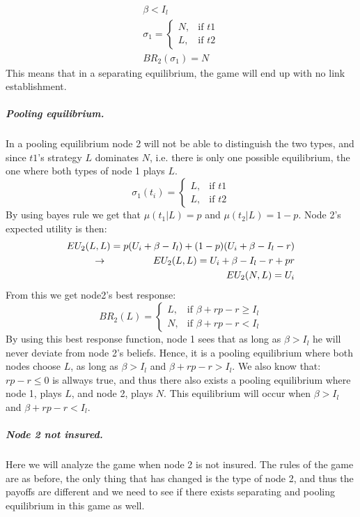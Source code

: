 \begin{eqnarray}
\beta<I_{l}\\
 \sigma_{1}= 
\begin{cases}
   N,& \text{if } t1\\
   L,& \text{if } t2  
\end{cases}\\
BR_{2}(\sigma_{1})=N
\end{eqnarray} 
This means that in a separating equilibrium, the game will end up with no link establishment.
\subparagraph{Pooling equilibrium.}
In a pooling equilibrium node 2 will not be able to distinguish the two types, and since $t1$'s strategy $L$ dominates $N$, i.e. there is only one possible equilibrium, the one where both types of node 1 plays $L$.
\begin{equation}
    \sigma_{1}(t_{i})= 
\begin{cases}
   L,& \text{if } t1\\
   L,& \text{if } t2  
\end{cases}
\label{eq:node2beliefpooling}
\end{equation}
By using bayes rule we get that $\mu(t_{1}|L)=p$ and $\mu(t_{2}|L)=1-p$.
Node 2's expected utility is then:
\begin{eqnarray}
EU_{2}(L,L)=p(U_{i}+\beta-I_{l})+(1-p)(U_{i}+\beta-I_{l}-r)\nonumber\\
\llap{$\rightarrow$\hspace{50pt}}EU_{2}(L,L)=U_{i}+\beta-I_{l}-r+pr\\
EU_{2}(N,L)=U_{i}
\end{eqnarray}
From this we get node2's best response:
\begin{equation}
BR_{2}(L)=
\begin{cases}
L ,& \text{if } \beta + rp-r\geq I_{l} \\
N ,& \text{if } \beta +rp -r < I_{l} 
\end{cases}
\end{equation}
By using this best response function, node 1 sees that as long as $\beta>I_{l}$ he will never deviate from node 2's beliefs. Hence, it is a pooling equilibrium where both nodes choose $L$, as long as $\beta>I_{l}$ and $\beta +rp-r>I_{l}$.
We also know that: $rp-r\leq0$ is allways true, and thus there also exists a pooling equilibrium where node 1, plays $L$, and node 2, plays $N$. This equilibrium will occur when $\beta>I_{l}$ and $\beta+rp-r<I_{l}$.
\subparagraph{Node 2 not insured.}
Here we will analyze the game when node 2 is not insured.
The rules of the game are as before, the only thing that has changed is the type of node 2, and thus the payoffs are different and we need to see if there exists separating and pooling equilibrium in this game as well.
